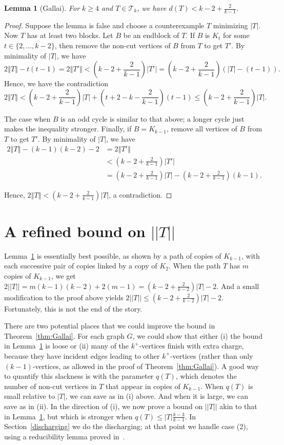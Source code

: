 \documentclass[12pt]{article}
\theoremstyle{plain}
\newtheorem{lem}[thm]{Lemma}
\theoremstyle{definition}
\theoremstyle{remark}
\newcommand{\fancy}[1]{\mathcal{#1}}
\newcommand{\T}{\fancy{T}}
\newcommand{\size}[1]{\left\Vert#1\right\Vert}
\newcommand{\parens}[1]{\left( #1 \right)}
\begin{document}
\begin{lem}[Gallai]
\label{BasicGallaiTreeBound}
	For $k \ge 4$ and $T \in \T_k$, we have $d(T) < k-2 + \frac{2}{k-1}$.
\end{lem}
\begin{proof}
	Suppose the lemma is false and choose a counterexample $T$ minimizing $|T|$.  Now $T$ has at least two blocks.  Let $B$ be an endblock of $T$.  If $B$ is $K_t$ for some $t\in \{2,\ldots, k-2\}$, then remove the non-cut vertices of $B$ from $T$ to get $T'$.  By minimality of $|T|$, we have 
	\[2\size{T} - t(t-1) = 2\size{T'} < \parens{k-2 + \frac{2}{k-1}}|T'| = \parens{k-2 + \frac{2}{k-1}}\parens{|T|-(t-1)}.\]
	Hence, we have the contradiction
	\[2\size{T} < \parens{k-2 + \frac{2}{k-1}}|T| + (t+2 -k - \frac{2}{k-1})(t-1) \le \parens{k-2 + \frac{2}{k-1}}|T|.\]
	
	The case when $B$ is an odd cycle is similar to that above; a longer cycle just makes the inequality stronger.  Finally, if $B = K_{k-1}$, remove all vertices of $B$ from $T$ to get $T'$. By minimality of $|T|$, we have 
	\begin{align*}
	  2\size{T} - (k-1)(k-2) - 2 &= 2\size{T'}\\
	  &< \parens{k-2 + \frac{2}{k-1}}|T'|\\
	  &= \parens{k-2 + \frac{2}{k-1}}|T| - \parens{k-2 + \frac{2}{k-1}}(k-1).
	\end{align*}

	Hence, $2\size{T} < \parens{k-2 + \frac{2}{k-1}}|T|$, a contradiction.
\end{proof}

\section{A refined bound on $||T||$}
Lemma~\ref{BasicGallaiTreeBound} is essentially best possible, as shown by a
path of copies of $K_{k-1}$, with each successive pair of copies linked by a
copy of $K_2$.  When the path $T$ has $m$ copies of $K_{k-1}$, we get
$2||T||=m(k-1)(k-2)+2(m-1) = (k-2+\frac2{k-2})|T|-2$.  And a small modification
to the proof above yields $2||T|| \le (k-2+\frac2{k-2})|T|-2$. 
Fortunately, this is not the end of the story.

There are two potential places that we could improve the bound in
Theorem~\ref{thm:Gallai}. For each graph $G$, we could show that either (i) the
bound in Lemma~\ref{BasicGallaiTreeBound} is loose or (ii) many of the
$k^+$-vertices finish with extra charge, because they have incident edges
leading to other $k^+$-vertices (rather than only $(k-1)$-vertices, as allowed
in the proof of Theorem~\ref{thm:Gallai}).  A good way to quantify this
slackness is with the parameter $q(T)$, which denotes the number of non-cut
vertices in $T$ that appear in copies of $K_{k-1}$.  When $q(T)$ is small
relative to $|T|$, we can save as in (i) above.  And when it is large, we can save
as in (ii).  In the direction of (i), we now prove a bound on $||T||$ akin to
that in Lemma~\ref{BasicGallaiTreeBound}, but which is stronger when
$q(T)\le|T|\frac{k-3}{k-1}$.  In Section~\ref{discharging} 
we do the discharging; at that point we handle case (2),
using a reducibility lemma proved in~\cite{KiersteadRabern}. 
\end{document}

